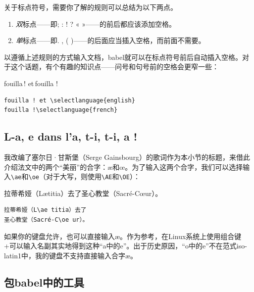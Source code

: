 关于标点符号，需要你了解的规则可以总结为以下两点。

\begin{enumerate}
    \item \emph{双}标点——即; : ! ? « »——的前后都应该添加空格。
    \item \emph{单}标点——即. , ( )——的后面应当插入空格，而前面不需要。
\end{enumerate}

以遵循上述规则的方式输入文档，\textsf{babel}就可以在标点符号前后自动插入空格。对于这个话题，有个有趣的知识点——问号和句号前的空格会更窄一些：

\begin{codelist}[7.1]{
    fouilla\,! et\enspace\,fouilla !
}
\begin{verbatim}
fouilla ! et \selectlanguage{english}
fouilla !\selectlanguage{french}\end{verbatim}
\end{codelist}

\subsection{L-a, e dans l'a, t-i, t-i, a !}

我改编了塞尔日·甘斯堡（Serge Gainsbourg）的歌词作为本小节的标题，来借此介绍法文中的两个“美丽”的合字：æ和œ。为了输入这两个合字，我们可以选择输入\verb|\ae|和\verb+\oe+（对于大写，则使用\verb|\AE|和\verb+\OE+）：

\begin{codelist}[7.2]{
    拉蒂希娅（L\ae titia）去了圣心教堂（Sacré-C\oe ur）。
}
\begin{verbatim}
拉蒂希娅（L\ae titia）去了
圣心教堂（Sacré-C\oe ur）。\end{verbatim}
\end{codelist}

如果你的键盘允许，也可以直接输入æ。作为参考，在Linux系统上使用组合键+可以输入名副其实地得到这种“a中的e”。出于历史原因，“o中的e”不在范式iso-latin1中，我的键盘不支持直接输入合字æ。

\subsection{包\textsf{babel}中的工具}

